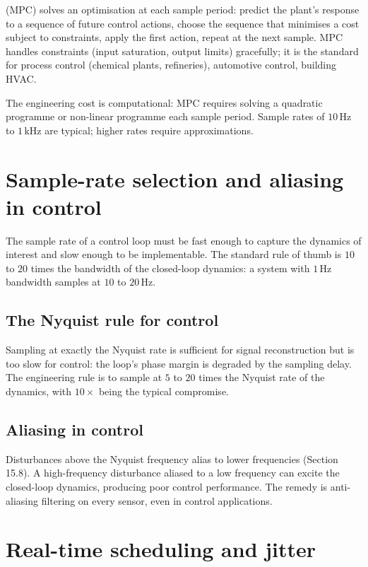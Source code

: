  (MPC) solves an optimisation at each sample period: predict the plant's response to a sequence of future control actions, choose the sequence that minimises a cost subject to constraints, apply the first action, repeat at the next sample. MPC handles constraints (input saturation, output limits) gracefully; it is the standard for process control (chemical plants, refineries), automotive control, building HVAC.

The engineering cost is computational: MPC requires solving a quadratic programme or non-linear programme each sample period. Sample rates of $10\,\si{\hertz}$ to $1\,\si{\kilo\hertz}$ are typical; higher rates require approximations.

\section{Sample-rate selection and aliasing in control}

The sample rate of a control loop must be fast enough to capture the dynamics of interest and slow enough to be implementable. The standard rule of thumb is $10$ to $20$ times the bandwidth of the closed-loop dynamics: a system with $1\,\si{\hertz}$ bandwidth samples at $10$ to $20\,\si{\hertz}$.

\subsection{The Nyquist rule for control}

Sampling at exactly the Nyquist rate is sufficient for signal reconstruction but is too slow for control: the loop's phase margin is degraded by the sampling delay. The engineering rule is to sample at $5$ to $20$ times the Nyquist rate of the dynamics, with $10\times$ being the typical compromise.

\subsection{Aliasing in control}

Disturbances above the Nyquist frequency alias to lower frequencies (Section 15.8). A high-frequency disturbance aliased to a low frequency can excite the closed-loop dynamics, producing poor control performance. The remedy is anti-aliasing filtering on every sensor, even in control applications.

\section{Real-time scheduling and jitter}

